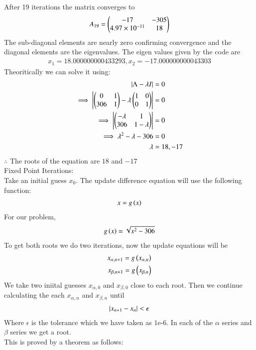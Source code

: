 \documentclass[journal]{IEEEtran}
\begin{document}
After 19 iterations the matrix converges to
\begin{align}
    A_{19}=\begin{pmatrix}-17&-305\\4.97\times 10^{-11}&18\end{pmatrix}
\end{align}
The sub-diagonal elements are nearly zero confirming convergence and the diagonal elements are the eigenvalues. The eigen values given by the code are
\begin{align}
	x_1 = 18.000000000433293,
	x_2 = -17.000000000043303
\end{align}
Theoritically we can solve it using:
\begin{align}
    \left\vert\Lambda - \lambda I\right\vert&=0\\
    \implies \left\vert\begin{pmatrix}0&1\\306&1\end{pmatrix}-\lambda\begin{pmatrix}1&0\\0&1\end{pmatrix}\right\vert&=0\\
    \implies \left\vert\begin{pmatrix}-\lambda&1\\306&1-\lambda\end{pmatrix}\right\vert&=0\\
    \implies \lambda^2-\lambda-306&=0\\
    \lambda&= 18,-17
\end{align}
$\therefore$ The roots of the equation are $18$ and $-17$\\
Fixed Point Iterations:\\
Take an initial guess $x_0$. The update difference equation will use the following function:
\begin{align}
    x = g\left(x\right)
\end{align}
For our problem,
\begin{align}
    g\left(x\right) = \sqrt{x^2-306}
\end{align}
To get both roots we do two iterations, now the update equations will be
\begin{align}
    x_{\alpha,n+1}=g\left(x_{\alpha,n}\right)\\
    x_{\beta,n+1}=g\left(x_{\beta,n}\right)\\
\end{align}
We take two iniital guesses $x_{\alpha,0}$ and $x_{\beta,0}$ close to each root. Then we continue calculating the each $x_{\alpha,n}$ and $x_{\beta,n}$ until
\begin{align}
    \left\vert x_{n+1}-x_n\right\vert<\epsilon
\end{align}
Where $\epsilon$ is the tolerance which we have taken as $1\text{e-}6$. In each of the $\alpha$ series and $\beta$ series we get a root.\\
\newline
This is proved by a theorem as follows:\\
\end{document}
